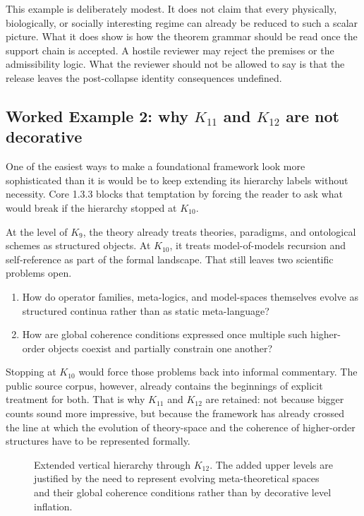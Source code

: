 This example is deliberately modest. It does not claim that every physically, biologically, or
socially interesting regime can already be reduced to such a scalar picture. What it does show is
how the theorem grammar should be read once the support chain is accepted. A hostile reviewer may
reject the premises or the admissibility logic. What the reviewer should not be allowed to say is
that the release leaves the post-collapse identity consequences undefined.

\subsection{Worked Example 2: why \texorpdfstring{$K_{11}$}{K11} and \texorpdfstring{$K_{12}$}{K12} are not decorative}

One of the easiest ways to make a foundational framework look more sophisticated than it is would
be to keep extending its hierarchy labels without necessity. Core 1.3.3 blocks that temptation by
forcing the reader to ask what would break if the hierarchy stopped at \(K_{10}\).

At the level of \(K_9\), the theory already treats theories, paradigms, and ontological schemes as
structured objects. At \(K_{10}\), it treats model-of-models recursion and self-reference as part
of the formal landscape. That still leaves two scientific problems open.

\begin{enumerate}
\item How do operator families, meta-logics, and model-spaces themselves evolve as structured
      continua rather than as static meta-language?
\item How are global coherence conditions expressed once multiple such higher-order objects coexist
      and partially constrain one another?
\end{enumerate}

Stopping at \(K_{10}\) would force those problems back into informal commentary. The public source
corpus, however, already contains the beginnings of explicit treatment for both. That is why
\(K_{11}\) and \(K_{12}\) are retained: not because bigger counts sound more impressive, but because the
framework has already crossed the line at which the evolution of theory-space and the coherence of
higher-order structures have to be represented formally.

\begin{figure}[htbp]
\centering

\caption{Extended vertical hierarchy through \(K_{12}\). The added upper levels are justified by
the need to represent evolving meta-theoretical spaces and their global coherence conditions rather
than by decorative level inflation.}
\label{fig:oc13-levels-k12}
\end{figure}

